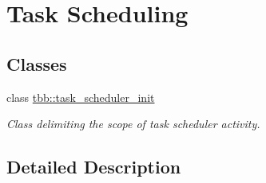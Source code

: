 \hypertarget{group__task__scheduling}{}\section{Task Scheduling}
\label{group__task__scheduling}
\subsection*{Classes}
\begin{DoxyCompactItemize}
\item 
class \hyperlink{classtbb_1_1task__scheduler__init}{tbb\+::task\+\_\+scheduler\+\_\+init}
\begin{DoxyCompactList}\small\item\em Class delimiting the scope of task scheduler activity. \end{DoxyCompactList}\end{DoxyCompactItemize}


\subsection{Detailed Description}
